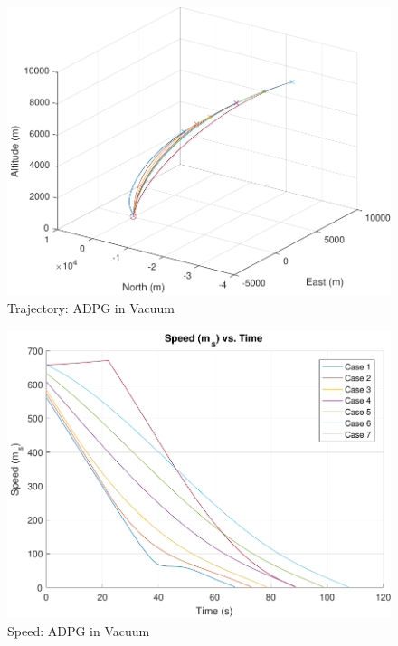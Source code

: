 \begin{figure}[H]
	\centering
	\begin{minipage}{4.5 in}
		\includegraphics[width=\linewidth]{Figures/trajpowvac.pdf}
		\caption{Trajectory: ADPG in Vacuum \label{fig:trajpowvac} }
	\end{minipage}
\end{figure}

\begin{figure}[H]
	\centering
	\begin{minipage}{4.5 in}
		\includegraphics[width=\linewidth]{Figures/spdpowvac.pdf}
		\caption{Speed: ADPG in Vacuum \label{fig:spdpowvac} }
	\end{minipage}
\end{figure}

